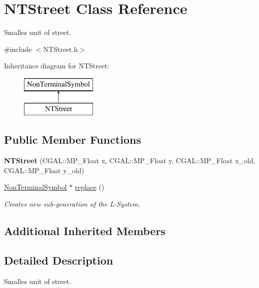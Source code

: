 \hypertarget{class_n_t_street}{}\section{N\+T\+Street Class Reference}
\label{class_n_t_street}


Smalles unit of street.  




{\ttfamily \#include $<$N\+T\+Street.\+h$>$}

Inheritance diagram for N\+T\+Street\+:\begin{figure}[H]
\begin{center}
\leavevmode
\includegraphics[height=2.000000cm]{class_n_t_street}
\end{center}
\end{figure}
\subsection*{Public Member Functions}
\begin{DoxyCompactItemize}
\item 
\hypertarget{class_n_t_street_aa0f2f63631f1cceea765e1c19f6180d6}{}\label{class_n_t_street_aa0f2f63631f1cceea765e1c19f6180d6} 
{\bfseries N\+T\+Street} (C\+G\+A\+L\+::\+M\+P\+\_\+\+Float x, C\+G\+A\+L\+::\+M\+P\+\_\+\+Float y, C\+G\+A\+L\+::\+M\+P\+\_\+\+Float x\+\_\+old, C\+G\+A\+L\+::\+M\+P\+\_\+\+Float y\+\_\+old)
\item 
\hyperlink{class_non_terminal_symbol}{Non\+Terminal\+Symbol} $\ast$ \hyperlink{class_n_t_street_ac3aa05ca530c99b178a855fc736b1a76}{replace} ()
\begin{DoxyCompactList}\small\item\em Creates new sub-\/generation of the L-\/\+System. \end{DoxyCompactList}\end{DoxyCompactItemize}
\subsection*{Additional Inherited Members}


\subsection{Detailed Description}
Smalles unit of street. 

